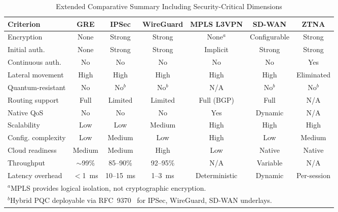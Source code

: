 \documentclass[conference]{IEEEtran}
\begin{document}
\begin{table}[htbp]
\caption{Extended Comparative Summary Including Security-Critical Dimensions}
\label{tab:comparison}
\centering
\renewcommand{\arraystretch}{1.3}
\begin{tabular}{lcccccc}
\toprule
\textbf{Criterion} & \textbf{GRE} & \textbf{IPSec} & \textbf{WireGuard}
  & \textbf{MPLS L3VPN} & \textbf{SD-WAN} & \textbf{ZTNA} \\
\midrule
Encryption          & None      & Strong    & Strong      & None$^{a}$    & Configurable & Strong \\
Initial auth.       & None      & Strong    & Strong      & Implicit      & Strong       & Strong \\
Continuous auth.    & No        & No        & No          & No            & No           & Yes \\
Lateral movement    & High      & High      & High        & High          & High         & Eliminated \\
Quantum-resistant   & No        & No$^{b}$  & No$^{b}$    & N/A           & No$^{b}$     & No$^{b}$ \\
Routing support     & Full      & Limited   & Limited     & Full (BGP)    & Full         & N/A \\
Native QoS          & No        & No        & No          & Yes           & Dynamic      & N/A \\
Scalability         & Low       & Low       & Medium      & High          & High         & High \\
Config. complexity  & Low       & Medium    & Low         & High          & Low          & Medium \\
Cloud readiness     & Medium    & Medium    & High        & Low           & Native       & Native \\
Throughput          & $\sim$99\%& 85--90\%  & 92--95\%    & N/A           & Variable     & N/A \\
Latency overhead    & $<$1~ms   & 10--15~ms & 1--3~ms     & Deterministic & Dynamic      & Per-session \\
\bottomrule
\multicolumn{7}{l}{\small $^{a}$MPLS provides logical isolation, not cryptographic encryption.} \\
\multicolumn{7}{l}{\small $^{b}$Hybrid PQC deployable via RFC~9370~\cite{rfc9370} for IPSec, WireGuard, SD-WAN underlays.} \\
\end{tabular}
\end{table}
\end{document}
